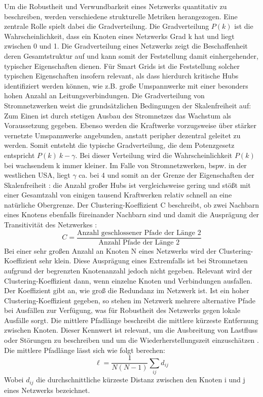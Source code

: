 Um die Robustheit und Verwundbarkeit eines Netzwerks quantitativ zu beschreiben, werden verschiedene strukturelle Metriken herangezogen. Eine zentrale Rolle spielt dabei die Gradverteilung.
Die Gradverteilung $P(k)$ ist die Wahrscheinlichkeit, dass ein Knoten eines Netzwerks Grad k hat und liegt zwischen 0 und 1. Die Gradverteilung eines Netzwerks zeigt die Beschaffenheit deren Gesamtstruktur auf und kann somit der Feststellung damit einhergehender, typischer Eigenschaften dienen. Für Smart Grids ist die Feststellung solcher typischen Eigenschaften insofern relevant, als dass hierdurch kritische Hubs identifiziert werden können, wie z.B. große Umspannwerke mit einer besonders hohen Anzahl an Leitungsverbindungen. Die Gradverteilung von Stromnetzwerken weist die grundsätzlichen Bedingungen der Skalenfreiheit auf: Zum Einen ist durch stetigen Ausbau des Stromnetzes das Wachstum als Voraussetzung gegeben. Ebenso werden die Kraftwerke vorzugsweise über stärker vernetzte Umspannwerke angebunden, anstatt peripher dezentral geleitet zu werden. Somit entsteht die typische Gradverteilung, die dem Potenzgesetz entspricht $P(k) ~ k-\gamma$. Bei dieser Verteilung wird die Wahrscheinlichkeit $P(k)$ bei wachsendem k immer kleiner. Im Falle von Stromnetzwerken, bspw. in der westlichen USA, liegt $\gamma$ ca. bei 4 und somit an der Grenze der Eigenschaften der Skalenfreiheit : die Anzahl großer Hubs ist vergleichsweise gering und stößt mit einer Gesamtzahl von einigen tausend Kraftwerken relativ schnell an eine natürliche Obergrenze. 
Der Clustering-Koeffizient C beschreibt, ob zwei Nachbarn eines Knotens ebenfalls füreinander Nachbarn sind und damit die Ausprägung der Transitivität des Netzwerkes : 
\[
C = \frac{\text{Anzahl geschlossener Pfade der L\"ange 2}}{\text{Anzahl Pfade der L\"ange 2}}
\]
Bei einer sehr großen Anzahl an Knoten N eines Netzwerks wird der Clustering-Koeffizient sehr klein. Diese Ausprägung eines Extremfalls ist bei Stromnetzen aufgrund der begrenzten Knotenanzahl jedoch nicht gegeben. Relevant wird der Clustering-Koeffizient dann, wenn einzelne Knoten und Verbindungen ausfallen. Der Koeffizient gibt an, wie groß die Redundanz im Netzwerk ist. Ist ein hoher Clustering-Koeffizient gegeben, so stehen im Netzwerk mehrere alternative Pfade bei Ausfällen zur Verfügung, was für Robustheit des Netzwerks gegen lokale Ausfälle sorgt. 
Die mittlere Pfadlänge beschreibt die mittlere kürzeste Entfernung zwischen Knoten. Dieser Kennwert ist relevant, um die Ausbreitung von Lastfluss oder Störungen zu beschreiben und um die Wiederherstellungszeit einzuschätzen . Die mittlere Pfadlänge lässt sich wie folgt berechen:
\[
\ell = \frac{1}{N(N-1)} \sum_{i j} d_{i j}
\]
Wobei $d_{ij}$ die durchschnittliche kürzeste Distanz zwischen den Knoten i und j eines Netzwerks bezeichnet.


